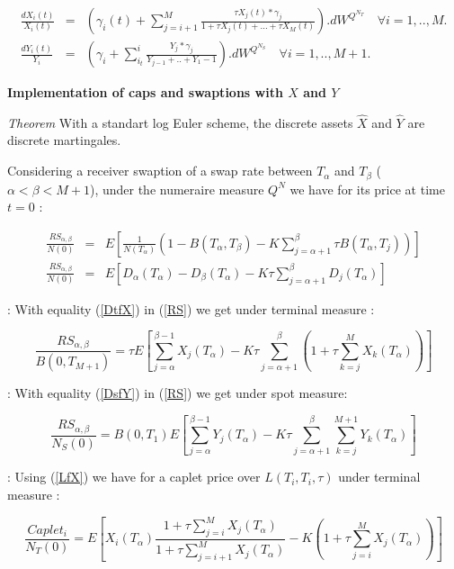\documentclass[10pt,a4paper,english,landscape]{slides}
\newcommand{\ba}{\begin{eqnarray}}
\newcommand{\ea}{\end{eqnarray}}
\begin{document}
\ba
\frac{dX_i(t)}{X_i(t)}&=&\left( \gamma_i(t) + \sum_{j=i+1}^M\frac{\tau 
    X_j(t)*\gamma_j}{1+\tau X_j(t)+...+\tau X_M(t)} \right).dW^{Q^{N_T}} \quad \forall i=1,..,M.\\
\frac{dY_i(t)}{Y_i}&=& \left(\gamma_i
+\sum_{i_t}^{i}\frac{Y_j *\gamma_j}{Y_{j-1}+..+Y_1-1}\right).dW^{Q^{N_S}} \quad
\forall i=1,..,M+1.
\ea


{\bf Implementation of caps and swaptions with $X$ and $Y$}

{\it Theorem} With a standart log Euler scheme, the discrete assets $\hat{X}$ and $\hat{Y}$ are discrete martingales.


\noindent Considering a receiver swaption of a swap rate between $T_\alpha$ and
$T_\beta$ ($\alpha<\beta<M+1$), under the numeraire measure $Q^N$ we
have for its price at time $t=0$ :

\ba
\frac{RS_{\alpha,\beta}}{N(0)}&=&E\left[\frac{1}{N(T_\alpha)}\left(1-B(T_\alpha,T_\beta)-K\sum_{j=\alpha+1}^\beta
    \tau B(T_\alpha,T_j)\right)\right]\\
\label{RS}
\frac{RS_{\alpha,\beta}}{N(0)}&=&E\left[D_\alpha(T_\alpha)-D_\beta(T_\alpha)-K\tau\sum_{j=\alpha+1}^\beta
  D_j(T_\alpha)\right]
\ea

 :
With equality (\ref{DtfX}) in (\ref{RS}) we get under terminal measure :

\begin{equation}
\frac{RS_{\alpha,\beta}}{B(0,T_{M+1})}=\tau E\left[ \sum_{j=\alpha}^{\beta-1}
  X_j(T_\alpha) - K\tau \sum_{j=\alpha+1}^\beta \left(1+\tau
    \sum_{k=j}^M X_k(T_\alpha)\right)\right]
\end{equation}

 :  
With equality (\ref{DsfY}) in (\ref{RS}) we get under spot measure:

\begin{equation}
\frac{RS_{\alpha,\beta}}{N_S(0)}= B(0,T_1)E\left[ \sum_{j=\alpha}^{\beta-1} 
  Y_j(T_\alpha) - K\tau \sum_{j=\alpha+1}^\beta 
    \sum_{k=j}^{M+1} Y_k(T_\alpha)\right]
\end{equation}

 :
Using (\ref{LfX}) we have for a caplet price over $L(T_i,T_i,\tau)$ under terminal measure :

\begin{equation}
\frac{Caplet_i}{N_T(0)}=E\left[X_i(T_\alpha)\frac{1+\tau \sum_{j=i}^{M}X_j(T_\alpha)}{ 1+\tau \sum_{j=i+1}^{M}X_j(T_\alpha)}-K\left(1+\tau \sum_{j=i}^{M}X_j(T_\alpha)\right)\right]
\end{equation}
\end{document}
